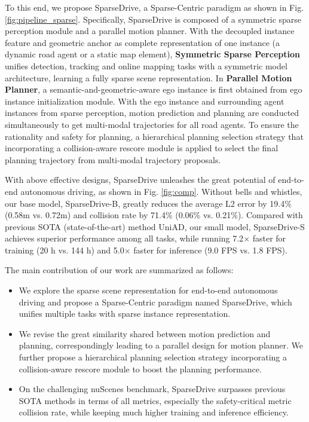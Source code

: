To this end, we propose SparseDrive, a Sparse-Centric paradigm as shown in Fig. \ref{fig:pipeline_sparse}. Specifically, SparseDrive is composed of a symmetric sparse perception module and a parallel motion planner. With the decoupled instance feature and geometric anchor as complete representation of one instance (a dynamic road agent or a static map element), \textbf{Symmetric Sparse Perception} unifies detection, tracking and online mapping tasks with a symmetric model architecture, learning a fully sparse scene representation. In \textbf{Parallel Motion Planner}, a semantic-and-geometric-aware ego instance is first obtained from ego instance initialization module. With the ego instance and surrounding agent instances from sparse perception, motion prediction and planning are conducted simultaneously to get multi-modal trajectories for all road agents. To ensure the rationality and safety for planning, a hierarchical planning selection strategy that incorporating a collision-aware rescore module is applied to select the final planning trajectory from multi-modal trajectory proposals.

With above effective designs, SparseDrive unleashes the great potential of end-to-end autonomous driving, as shown in Fig. \ref{fig:comp}. Without bells and whistles, our base model, SparseDrive-B, greatly reduces the average L2 error by 19.4\% (0.58m vs. 0.72m) and collision rate by 71.4\% (0.06\% vs. 0.21\%). Compared with previous SOTA (state-of-the-art) method UniAD\cite{uniad}, our small model, SparseDrive-S achieves superior performance among all tasks, while running 7.2$\times$ faster for training (20 h vs. 144 h) and 5.0$\times$ faster for inference (9.0 FPS vs. 1.8 FPS).
  
The main contribution of our work are summarized as follows:
\begin{itemize}[leftmargin=*]
\item We explore the sparse scene representation for end-to-end autonomous driving and propose a Sparse-Centric paradigm named SparseDrive, which unifies multiple tasks with sparse instance representation.
\item We revise the great similarity shared between motion prediction and planning, correspondingly leading to a parallel design for motion planner. We further propose a hierarchical planning selection strategy incorporating a collision-aware rescore module to boost the planning performance.
\item On the challenging nuScenes\cite{nuscenes} benchmark, SparseDrive surpasses previous SOTA methods in terms of all metrics, especially the safety-critical metric collision rate, while keeping much higher training and inference efficiency.
\end{itemize}